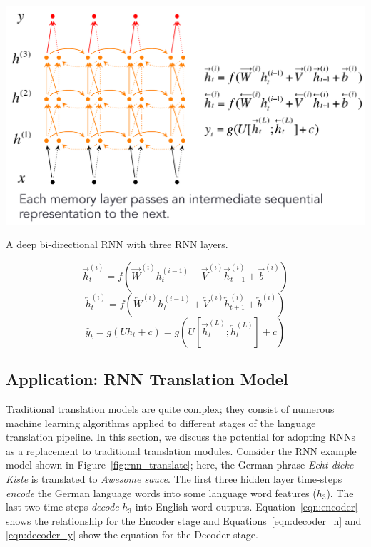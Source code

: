 \documentclass{tufte-handout}
\begin{document}
\begin{marginfigure}
	\centering
	\includegraphics[width=\linewidth]{deepbirnn.pdf}
	\caption {A deep bi-directional RNN with three RNN layers.}
	\label{fig:deepbirnn}
\end{marginfigure}

\begin{equation}
	\overrightarrow{h}_t^{(i)} = f(\overrightarrow{W}^{(i)} h_t^{(i-1)} + \overrightarrow{V}^{(i)} \overrightarrow{h}_{t-1}^{(i)} + \overrightarrow{b}^{(i)})
	\label{eqn:d_rnn_right}
\end{equation}
\begin{equation}
	\overleftarrow{h}_t^{(i)} = f(\overleftarrow{W}^{(i)} h_t^{(i-1)} + \overleftarrow{V}^{(i)} \overleftarrow{h}_{t+1}^{(i)} + \overleftarrow{b}^{(i)})
	\label{eqn:d_rnn_left}
\end{equation}
\begin{equation}
	\hat{y}_t = g(U h_t + c) = g(U [\overrightarrow{h}_t^{(L)}; \overleftarrow{h}_t^{(L)}] + c)
	\label{eqn:d_birnn_classifier}
\end{equation}

\subsection{Application: RNN Translation Model}
Traditional translation models are quite complex; they consist of numerous machine learning algorithms applied to different stages of the language translation pipeline. In this section, we discuss the potential for adopting RNNs as a replacement to traditional translation modules. Consider the RNN example model shown in Figure~\ref{fig:rnn_translate}; here, the German phrase \textit{Echt dicke Kiste} is translated to \textit{Awesome sauce}. The first three hidden layer time-steps \textit{encode} the German language words into some language word features ($h_3$). The last two time-steps \textit{decode} $h_3$ into English word outputs. Equation~\ref{eqn:encoder} shows the relationship for the Encoder stage and Equations~\ref{eqn:decoder_h} and \ref{eqn:decoder_y} show the equation for the Decoder stage.
\end{document}
